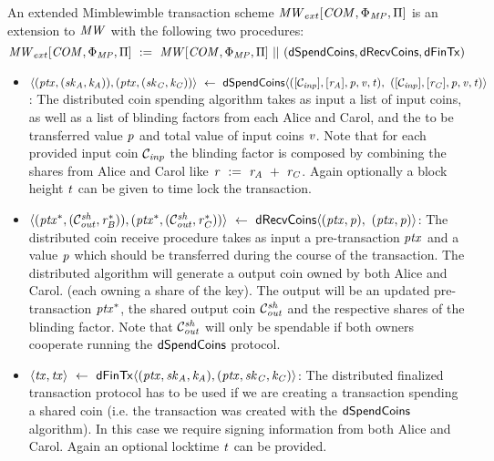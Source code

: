 \begin{definition}
    \label{def:ext-mw-tx-scheme}
    An extended Mimblewimble transaction scheme $\mathit{MW}_{ext}[\mathit{COM},\Phi_{\mathit{MP}},\Pi]$ is an extension to $\mathit{MW}$ with the following two procedures:
    \[ \mathit{MW}_{ext}[\mathit{COM},\Phi_{\mathit{MP}},\Pi] ~:=~ \mathit{MW}[\mathit{COM},\Phi_{\mathit{MP}},\Pi] ~||~ (\mathsf{dSpendCoins}, \mathsf{dRecvCoins}, \mathsf{dFinTx}) \]
    \begin{itemize}
        \item $\langle (\mathit{ptx},(\mathit{sk}_{\mathit{A}},\mathit{\mathit{k}_{\mathit{A}}})), (\mathit{ptx},(\mathit{sk}_{\mathit{C}},\mathit{\mathit{k}_{\mathit{C}}})) \rangle \\
        ~\leftarrow~ \mathsf{dSpendCoins} \langle ([\mathcal{C}_{\mathit{inp}}],[\mathit{r}_{\mathit{A}}],\mathit{p},\mathit{v},\mathit{t}) ,~ ([\mathcal{C}_{\mathit{inp}}],[\mathit{r}_{\mathit{C}}],\mathit{p},\mathit{v},\mathit{t}) \rangle$:
        The distributed coin spending algorithm takes as input a list of input coins, as well as a list of blinding factors from each Alice and Carol, and the to be transferred value $\mathit{p}$ and total value of input coins $\mathit{v}$.
        Note that for each provided input coin $\mathcal{C}_{\mathit{inp}}$ the blinding factor is composed by combining the shares from Alice and Carol like
        $\mathit{r} ~:=~ \mathit{r}_{\mathit{A}} ~+~ \mathit{r}_{\mathit{C}}$.
        Again optionally a block height $\mathit{t}$ can be given to time lock the transaction.
        \item $\langle (\mathit{ptx}^*, (\mathcal{C}_{\mathit{out}}^{\mathit{sh}}, \mathit{r}_{\mathit{B}}^*)), (\mathit{ptx}^*, (\mathcal{C}_{\mathit{out}}^{\mathit{sh}}, \mathit{r}_{\mathit{C}}^*)) \rangle ~\leftarrow~ \mathsf{dRecvCoins} \langle(\mathit{ptx},\mathit{p}) ,~ (\mathit{ptx},\mathit{p}) \rangle$: The distributed coin receive procedure takes as input a pre-transaction $\mathit{ptx}$ and a value $\mathit{p}$ which should be transferred during the course of the transaction.
        The distributed algorithm will generate a output coin owned by both Alice and Carol. (each owning a share of the key).
        The output will be an updated pre-transaction $\mathit{ptx}^*$, the shared output coin $\mathcal{C}_{\mathit{out}}^{\mathit{sh}}$ and the respective shares of the blinding factor.
        Note that $\mathcal{C}_{\mathit{out}}^{\mathit{sh}}$ will only be spendable if both owners cooperate running the $\mathsf{dSpendCoins}$ protocol.
        \item $\langle \mathit{tx}, \mathit{tx} \rangle ~\leftarrow~ \mathsf{dFinTx} \langle(\mathit{ptx},\mathit{sk}_{\mathit{A}},\mathit{\mathit{k}_{\mathit{A}}}),(\mathit{ptx},\mathit{sk}_{\mathit{C}},\mathit{\mathit{k}_{\mathit{C}}})\rangle$: The distributed finalized transaction protocol has to be used if we are creating a transaction spending a shared coin (i.e. the transaction was created with the $\mathsf{dSpendCoins}$ algorithm).
        In this case we require signing information from both Alice and Carol.
        Again an optional locktime $\mathit{t}$ can be provided.
    \end{itemize}
\end{definition}

